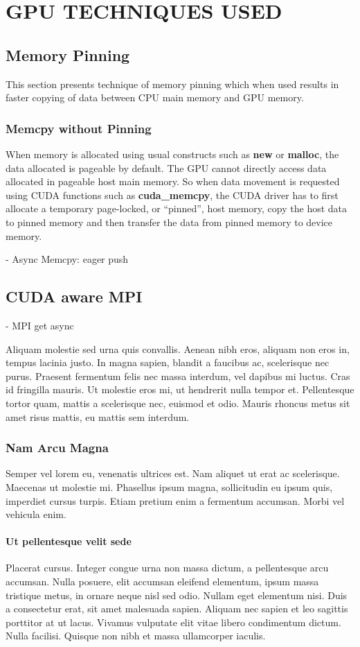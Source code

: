 \chapter{GPU TECHNIQUES USED} \label{gputechniques}

\section{Memory Pinning}
This section presents technique of memory pinning which when used results in
faster copying of data between CPU main memory and GPU memory.

\subsection{Memcpy without Pinning}
When memory is allocated using usual constructs such as \textbf{new} or
\textbf{malloc}, the data allocated is pageable by default. The GPU cannot
directly access data allocated in pageable host main memory. So when data
movement is requested using CUDA functions such as \textbf{cuda_memcpy}, the
CUDA driver has to first allocate a temporary page-locked, or ``pinned'', host
memory, copy the host data to pinned memory and then transfer the data from
pinned memory to device memory.

- Async Memcpy: eager push

\section{CUDA aware MPI}
- MPI get async

Aliquam molestie sed urna quis convallis. Aenean nibh eros, aliquam non eros in, tempus lacinia justo. In magna sapien, blandit a faucibus ac, scelerisque nec purus. Praesent fermentum felis nec massa interdum, vel dapibus mi luctus. Cras id fringilla mauris. Ut molestie eros mi, ut hendrerit nulla tempor et. Pellentesque tortor quam, mattis a scelerisque nec, euismod et odio. Mauris rhoncus metus sit amet risus mattis, eu mattis sem interdum.

\subsection{Nam Arcu Magna}
Semper vel lorem eu, venenatis ultrices est. Nam aliquet ut erat ac scelerisque. Maecenas ut molestie mi. Phasellus ipsum magna, sollicitudin eu ipsum quis, imperdiet cursus turpis. Etiam pretium enim a fermentum accumsan. Morbi vel vehicula enim.

\subsubsection{Ut pellentesque velit sede}
 Placerat cursus. Integer congue urna non massa dictum, a pellentesque arcu accumsan. Nulla posuere, elit accumsan eleifend elementum, ipsum massa tristique metus, in ornare neque nisl sed odio. Nullam eget elementum nisi. Duis a consectetur erat, sit amet malesuada sapien. Aliquam nec sapien et leo sagittis porttitor at ut lacus. Vivamus vulputate elit vitae libero condimentum dictum. Nulla facilisi. Quisque non nibh et massa ullamcorper iaculis.

